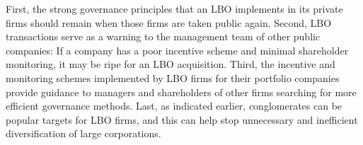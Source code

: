 \documentclass[11pt]{article}
\begin{document}
First, the strong governance principles that an LBO implements in its private firms should remain when those firms are taken public again. Second, LBO transactions serve as a warning to the management team of other public companies: If a company has a poor incentive scheme and minimal shareholder monitoring, it may be ripe for an LBO acquisition. Third, the incentive and monitoring schemes implemented by LBO firms for their portfolio companies provide guidance to managers and shareholders of other firms searching for more efficient governance methods. Last, as indicated earlier, conglomerates can be popular targets for LBO firms, and this can help stop unnecessary and inefficient diversification of large corporations.
\end{document}
